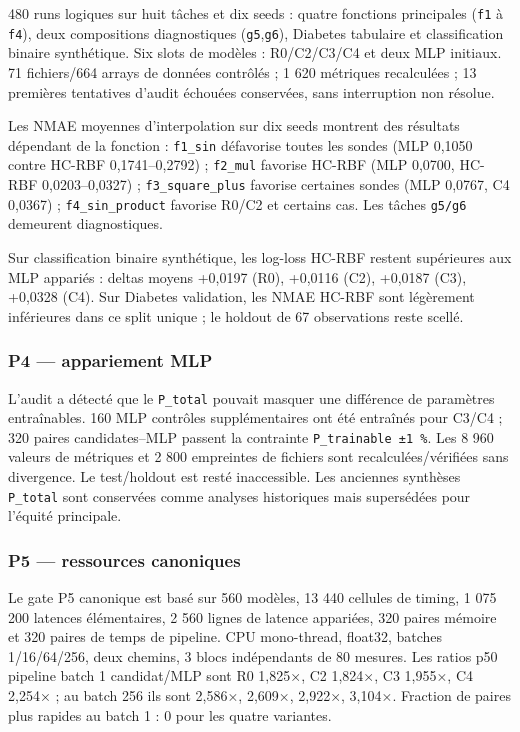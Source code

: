 \documentclass[
]{article}
\begin{document}
480 runs logiques sur huit tâches et dix seeds : quatre fonctions
principales (\texttt{f1} à \texttt{f4}), deux compositions diagnostiques
(\texttt{g5},\texttt{g6}), Diabetes tabulaire et classification binaire
synthétique. Six slots de modèles : R0/C2/C3/C4 et deux MLP initiaux. 71
fichiers/664 arrays de données contrôlés ; 1 620 métriques recalculées ;
13 premières tentatives d'audit échouées conservées, sans interruption
non résolue.

Les NMAE moyennes d'interpolation sur dix seeds montrent des résultats
dépendant de la fonction : \texttt{f1\_sin} défavorise toutes les sondes
(MLP 0,1050 contre HC-RBF 0,1741--0,2792) ; \texttt{f2\_mul} favorise
HC-RBF (MLP 0,0700, HC-RBF 0,0203--0,0327) ; \texttt{f3\_square\_plus}
favorise certaines sondes (MLP 0,0767, C4 0,0367) ;
\texttt{f4\_sin\_product} favorise R0/C2 et certains cas. Les tâches
\texttt{g5/g6} demeurent diagnostiques.

Sur classification binaire synthétique, les log-loss HC-RBF restent
supérieures aux MLP appariés : deltas moyens +0,0197 (R0), +0,0116 (C2),
+0,0187 (C3), +0,0328 (C4). Sur Diabetes validation, les NMAE HC-RBF
sont légèrement inférieures dans ce split unique ; le holdout de 67
observations reste scellé.

\subsubsection{P4 --- appariement MLP}\label{p4-appariement-mlp}

L'audit a détecté que le \texttt{P\_total} pouvait masquer une
différence de paramètres entraînables. 160 MLP contrôles supplémentaires
ont été entraînés pour C3/C4 ; 320 paires candidates--MLP passent la
contrainte \texttt{P\_trainable\ ±1\ \%}. Les 8 960 valeurs de métriques
et 2 800 empreintes de fichiers sont recalculées/vérifiées sans
divergence. Le test/holdout est resté inaccessible. Les anciennes
synthèses \texttt{P\_total} sont conservées comme analyses historiques
mais supersédées pour l'équité principale.

\subsubsection{P5 --- ressources
canoniques}\label{p5-ressources-canoniques}

Le gate P5 canonique est basé sur 560 modèles, 13 440 cellules de
timing, 1 075 200 latences élémentaires, 2 560 lignes de latence
appariées, 320 paires mémoire et 320 paires de temps de pipeline. CPU
mono-thread, float32, batches 1/16/64/256, deux chemins, 3 blocs
indépendants de 80 mesures. Les ratios p50 pipeline batch 1 candidat/MLP
sont R0 1,825×, C2 1,824×, C3 1,955×, C4 2,254× ; au batch 256 ils sont
2,586×, 2,609×, 2,922×, 3,104×. Fraction de paires plus rapides au batch
1 : 0 pour les quatre variantes.
\end{document}
